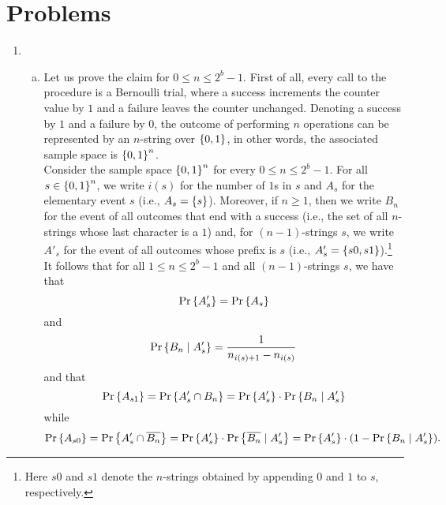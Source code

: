 \section*{Problems}
\begin{enumerate}[\thechapter-1]
%
\item
\begin{enumerate}[(a)]
\item Let us prove the claim for $0 \leq n \leq 2^b - 1$. First of all, every call to the procedure  is a Bernoulli trial, where a success increments the counter value by $1$ and a failure leaves the counter unchanged. Denoting a success by $1$ and a failure by $0$, the outcome of performing $n$  operations can be represented by an $n$-string over $\left\{0, 1\right\}$, in other words, the associated sample space is $\left\{0, 1\right\}^{n}$.
\medskip\\
Consider the sample space $\left\{0, 1\right\}^{n}$ for every $0 \leq n \leq 2^b - 1$. For all $s \in \left\{0, 1\right\}^{n}$, we write $i(s)$ for the number of $1$s in $s$ and $A_s$ for the elementary event $s$ (i.e., $A_s = \left\{s\right\}$). Moreover, if $n \geq 1$, then we write $B_n$ for the event of all outcomes that end with a success (i.e., the set of all $n$-strings whose last character is a $1$) and, for $(n - 1)$-strings $s$, we write $A'_s$ for the event of all outcomes whose prefix is $s$ (i.e., $A'_s = \left\{s0, s1\right\}$).\footnote{Here $s0$ and $s1$ denote the $n$-strings obtained by appending $0$ and $1$ to $s$, respectively.}
\medskip\\
It follows that for all $1 \leq n \leq 2^b - 1$ and all $(n - 1)$-strings $s$, we have that
\[
\Pr\left\{A'_s\right\} = \Pr\left\{A_s\right\}
\]
and
\[
\Pr\left\{B_n \mid A'_s\right\} = \frac{1}{n_{i(s) + 1} - n_{i(s)}}
\]
and that
\[
\Pr\left\{A_{s1}\right\} = \Pr\left\{A'_s \cap B_n\right\} = \Pr\left\{A'_s\right\} \cdot \Pr\left\{B_n \mid A'_s\right\}
\]
while
\[
\Pr\left\{A_{s0}\right\} = \Pr\left\{A'_s \cap \overline{B_n}\right\} = \Pr\left\{A'_s\right\} \cdot \Pr\left\{\overline{B_n} \mid A'_s\right\} = \Pr\left\{A'_s\right\} \cdot (1 - \Pr\left\{B_n \mid A'_s\right\}).
\]


\end{enumerate}
\end{enumerate}
